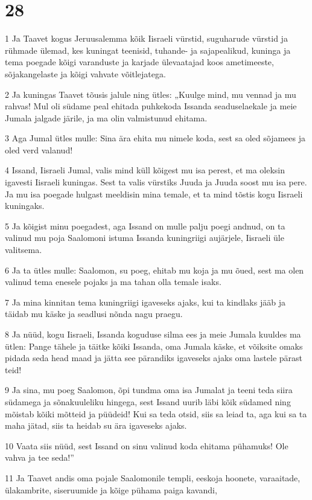 \chapter{28}

\par 1 Ja Taavet kogus Jeruusalemma kõik Iisraeli vürstid, suguharude vürstid ja rühmade ülemad, kes kuningat teenisid, tuhande- ja sajapealikud, kuninga ja tema poegade kõigi varanduste ja karjade ülevaatajad koos ametimeeste, sõjakangelaste ja kõigi vahvate võitlejatega.
\par 2 Ja kuningas Taavet tõusis jalule ning ütles: „Kuulge mind, mu vennad ja mu rahvas! Mul oli südame peal ehitada puhkekoda Issanda seaduselaekale ja meie Jumala jalgade järile, ja ma olin valmistunud ehitama.
\par 3 Aga Jumal ütles mulle: Sina ära ehita mu nimele koda, sest sa oled sõjamees ja oled verd valanud!
\par 4 Issand, Iisraeli Jumal, valis mind küll kõigest mu isa perest, et ma oleksin igavesti Iisraeli kuningas. Sest ta valis vürstiks Juuda ja Juuda soost mu isa pere. Ja mu isa poegade hulgast meeldisin mina temale, et ta mind tõstis kogu Iisraeli kuningaks.
\par 5 Ja kõigist minu poegadest, aga Issand on mulle palju poegi andnud, on ta valinud mu poja Saalomoni istuma Issanda kuningriigi aujärjele, Iisraeli üle valitsema.
\par 6 Ja ta ütles mulle: Saalomon, su poeg, ehitab mu koja ja mu õued, sest ma olen valinud tema enesele pojaks ja ma tahan olla temale isaks.
\par 7 Ja mina kinnitan tema kuningriigi igaveseks ajaks, kui ta kindlaks jääb ja täidab mu käske ja seadlusi nõnda nagu praegu.
\par 8 Ja nüüd, kogu Iisraeli, Issanda koguduse silma ees ja meie Jumala kuuldes ma ütlen: Pange tähele ja täitke kõiki Issanda, oma Jumala käske, et võiksite omaks pidada seda head maad ja jätta see pärandiks igaveseks ajaks oma lastele pärast teid!
\par 9 Ja sina, mu poeg Saalomon, õpi tundma oma isa Jumalat ja teeni teda siira südamega ja sõnakuuleliku hingega, sest Issand uurib läbi kõik südamed ning mõistab kõiki mõtteid ja püüdeid! Kui sa teda otsid, siis sa leiad ta, aga kui sa ta maha jätad, siis ta heidab su ära igaveseks ajaks.
\par 10 Vaata siis nüüd, sest Issand on sinu valinud koda ehitama pühamuks! Ole vahva ja tee seda!”
\par 11 Ja Taavet andis oma pojale Saalomonile templi, eeskoja hoonete, varaaitade, ülakambrite, siseruumide ja kõige pühama paiga kavandi,
